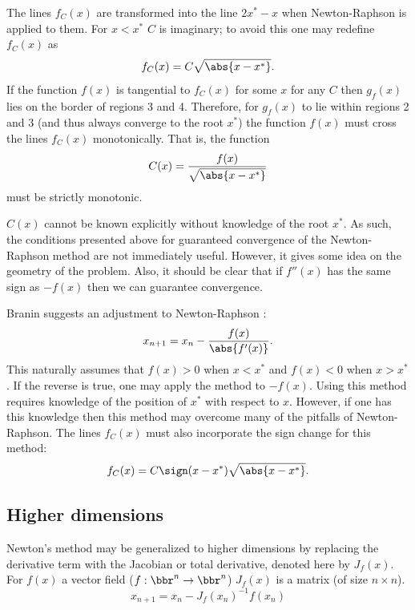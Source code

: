 \documentclass{article}
\begin{document}
The lines $f_C(x)$ are transformed into the line $2 x^* - x$ when Newton-Raphson is applied to them.
For $x < x^*$ $C$ is imaginary; to avoid this one may redefine $f_C(x)$ as
\begin{equation}
f_C(x) = C \sqrt{\abs{x - x^*}} .
\end{equation}
If the function $f(x)$ is tangential to $f_C(x)$ for some $x$ for any $C$ then $g_f(x)$ lies on the border of regions 3 and 4.
Therefore, for $g_f(x)$ to lie within regions 2 and 3 (and thus always converge to the root $x^*$) the function $f(x)$ must cross the lines $f_C(x)$ monotonically.
That is, the function
\begin{equation*}
C(x) = \frac{f(x)}{\sqrt{\abs{x-x^*}}}
\end{equation*}
must be strictly monotonic.

$C(x)$ cannot be known explicitly without knowledge of the root $x^*$.
As such, the conditions presented above for guaranteed convergence of the Newton-Raphson method are not immediately useful.
However, it gives some idea on the geometry of the problem.
Also, it should be clear that if $f''(x)$ has the same sign as $-f(x)$ then we can guarantee convergence.

Branin suggests an adjustment to Newton-Raphson \cite{branin1972widely}:
\begin{equation*}
x_{n+1} = x_n - \frac{f(x)}{\abs{f'(x)}} .
\end{equation*}
This naturally assumes that $f(x) > 0$ when $x < x^*$ and $f(x) < 0$ when $x > x^*$.
If the reverse is true, one may apply the method to $-f(x)$.
Using this method requires knowledge of the position of $x^*$ with respect to $x$.
However, if one has this knowledge then this method may overcome many of the pitfalls of Newton-Raphson.
The lines $f_C(x)$ must also incorporate the sign change for this method:
\begin{equation*}
f_C(x) = C \sign(x - x^*) \sqrt{\abs{x-x^*}} .
\end{equation*}

\subsection{Higher dimensions}

Newton's method may be generalized to higher dimensions by replacing the derivative term with the Jacobian or total derivative, denoted here by $J_f(x)$.
For $f(x)$ a vector field ($f:\bbr^n \to \bbr^n$) $J_f(x)$ is a matrix (of size $n \times n$).
\begin{equation} \label{eq:NRgen}
	x_{n+1} = x_n - J_f(x_n)^{-1} f(x_n)
\end{equation}
\end{document}
